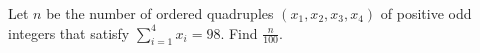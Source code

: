 Let $n$ be the number of ordered quadruples $(x_1,x_2,x_3,x_4)$ of positive odd integers that satisfy $\sum_{i=1}^4 x_i=98.$  Find $\frac n{100}.$